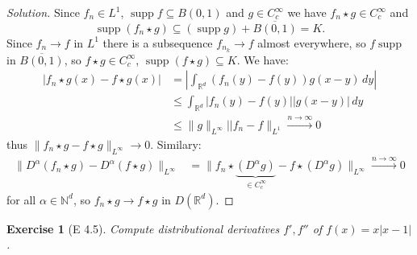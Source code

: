 \documentclass{report}
\theoremstyle{tommy}
\newtheorem{ex}[defn]{Exercise}
\newcommand{\supp}{\operatorname{supp}}
\begin{document}
  \begin{proof}[Solution]
    Since \(f_n \in L^1\), \(\supp f \subseteq B(0,1)\) and \(g \in C_c^\infty\) we have \(f_n \star g \in C_c^\infty\) and \[\supp(f_n \star g) \subseteq (\supp g) + \overline{B(0,1)} = K.\] Since \(f_n \to f\) in \(L^1\) there is a subsequence \(f_{n_k} \to f\) almost everywhere, so \(f \supp\) in \(\overline{B(0,1)}\), so \(f \star g \in C_c^\infty\), \(\supp(f \star g) \subseteq K\). We have:
    \begin{align*}
      |f_n \star g(x) - f \star g(x)| 
      &= \left|\int_{\mathbb{R}^d} (f_n(y)-f(y))g(x-y) \, dy \right| \\
      &\le \int_{\mathbb{R}^d} |f_n(y) - f(y)| |g(x-y)| \, dy \\
      &\le \|g\|_{L^\infty} ||f_n - f\|_{L^1} 
      \xrightarrow{n \to \infty} 0
    \end{align*}
    thus \(\|f_n \star g - f \star g\|_{L^\infty} \to 0\). Similary:
    \begin{align*}
      \|D^\alpha(f_n \star g) - D^\alpha (f\star g)\|_{L^\infty} 
      &= \|f_n \star \underbrace{(D^\alpha g)}_{\in C_c^\infty} - f \star (D^\alpha g)\|_{L^\infty} \xrightarrow{n \to \infty} 0
    \end{align*}
    for all \(\alpha \in \mathbb{N}^d\), so \(f_n \star g \to f \star g\) in \(D(\mathbb{R}^d)\).
  \end{proof}

  \begin{ex}[E 4.5]
    Compute distributional derivatives \(f', f''\) of \(f(x) = x|x-1|\).
  \end{ex}
\end{document}
